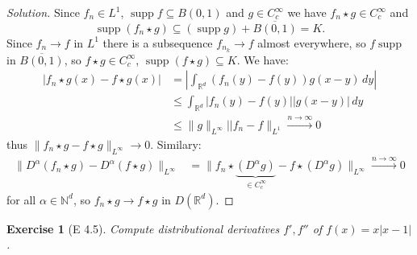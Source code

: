 \documentclass{report}
\theoremstyle{tommy}
\newtheorem{ex}[defn]{Exercise}
\newcommand{\supp}{\operatorname{supp}}
\begin{document}
  \begin{proof}[Solution]
    Since \(f_n \in L^1\), \(\supp f \subseteq B(0,1)\) and \(g \in C_c^\infty\) we have \(f_n \star g \in C_c^\infty\) and \[\supp(f_n \star g) \subseteq (\supp g) + \overline{B(0,1)} = K.\] Since \(f_n \to f\) in \(L^1\) there is a subsequence \(f_{n_k} \to f\) almost everywhere, so \(f \supp\) in \(\overline{B(0,1)}\), so \(f \star g \in C_c^\infty\), \(\supp(f \star g) \subseteq K\). We have:
    \begin{align*}
      |f_n \star g(x) - f \star g(x)| 
      &= \left|\int_{\mathbb{R}^d} (f_n(y)-f(y))g(x-y) \, dy \right| \\
      &\le \int_{\mathbb{R}^d} |f_n(y) - f(y)| |g(x-y)| \, dy \\
      &\le \|g\|_{L^\infty} ||f_n - f\|_{L^1} 
      \xrightarrow{n \to \infty} 0
    \end{align*}
    thus \(\|f_n \star g - f \star g\|_{L^\infty} \to 0\). Similary:
    \begin{align*}
      \|D^\alpha(f_n \star g) - D^\alpha (f\star g)\|_{L^\infty} 
      &= \|f_n \star \underbrace{(D^\alpha g)}_{\in C_c^\infty} - f \star (D^\alpha g)\|_{L^\infty} \xrightarrow{n \to \infty} 0
    \end{align*}
    for all \(\alpha \in \mathbb{N}^d\), so \(f_n \star g \to f \star g\) in \(D(\mathbb{R}^d)\).
  \end{proof}

  \begin{ex}[E 4.5]
    Compute distributional derivatives \(f', f''\) of \(f(x) = x|x-1|\).
  \end{ex}
\end{document}
